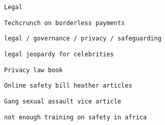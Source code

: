      

     
     
      \protect\hypertarget{ID_734971059}{}{}

\begin{verbatim}
Legal
\end{verbatim}

       
       
        \protect\hypertarget{ID_1242804297}{}{}

\begin{verbatim}
Techcrunch on borderless payments
\end{verbatim}
       
     

     
     
      \protect\hypertarget{ID_933513294}{}{}

\begin{verbatim}
legal / governance / privacy / safeguarding
\end{verbatim}

       
       
        \protect\hypertarget{ID_603733201}{}{}

\begin{verbatim}
legal jeopardy for celebrities
\end{verbatim}
       

       
       
        \protect\hypertarget{ID_1088109377}{}{}

\begin{verbatim}
Privacy law book
\end{verbatim}
       

       
       
        \protect\hypertarget{ID_761707102}{}{}

\begin{verbatim}
Online safety bill heather articles
\end{verbatim}
       

       
       
        \protect\hypertarget{ID_856591653}{}{}

\begin{verbatim}
Gang sexual assault vice article
\end{verbatim}
       

       
       
        \protect\hypertarget{ID_392536483}{}{}

\begin{verbatim}
not enough training on safety in africa
\end{verbatim}
       
